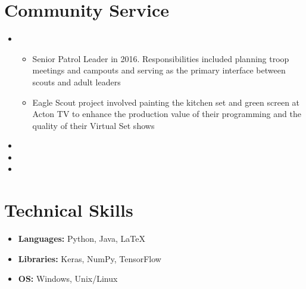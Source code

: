 \documentclass[11pt,a4paper,sans]{moderncv}        %
\begin{document}
\section{Community Service}
\vspace{5pt}
\begin{itemize}
\item {}
{\vspace{3pt} 
\begin{itemize}
\item Senior Patrol Leader in 2016. Responsibilities included planning troop meetings and campouts and serving as the primary interface between scouts and adult leaders
\item Eagle Scout project involved painting the kitchen set and green screen at Acton TV to enhance the production
value of their programming and the quality of their Virtual Set shows
\end{itemize}}
\item {}
\item {}
\item {}
\end{itemize}

\section{Technical Skills}
\vspace{5pt}
\begin{itemize}
\item \textbf{Languages:} Python, Java, \LaTeX
\vspace{5pt}
\item \textbf{Libraries:} Keras, NumPy, TensorFlow
\vspace{5pt}
\item \textbf{OS:} Windows, Unix/Linux
\end{itemize}
\end{document}
